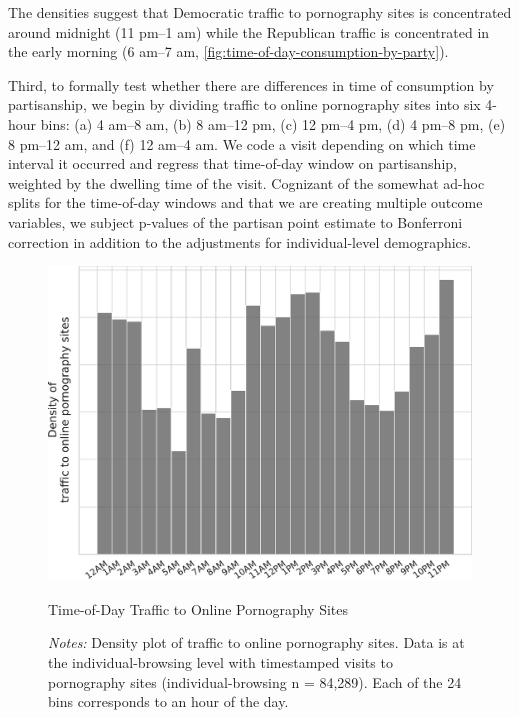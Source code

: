 \documentclass[12pt,twoside]{article}
\begin{document}
The densities suggest that Democratic traffic to pornography sites is concentrated around midnight (11 pm--1 am) while the Republican traffic is concentrated in the early morning (6 am--7 am, \cref{fig:time-of-day-consumption-by-party}).

Third, to formally test whether there are differences in time of consumption by partisanship, we begin by dividing traffic to online pornography sites into six 4-hour bins: (a) 4 am--8 am, (b) 8 am--12 pm, (c) 12 pm--4 pm, (d) 4 pm--8 pm, (e) 8 pm--12 am, and (f) 12 am--4 am. We code a visit depending on which time interval it occurred and regress that time-of-day window on partisanship, weighted by the dwelling time of the visit. Cognizant of the somewhat ad-hoc splits for the time-of-day windows and that we are creating multiple outcome variables, we subject p-values of the partisan point estimate to Bonferroni correction in addition to the adjustments for individual-level demographics.

\begin{figure}[ht]
\centering
    \includegraphics[width=.75\linewidth]{figs/time-of-day-consumption.pdf}
\caption{Time-of-Day Traffic to Online Pornography Sites}
\caption*{\footnotesize \emph{Notes:} 
        Density plot of traffic to online pornography sites.
        Data is at the individual-browsing level with timestamped visits to pornography sites (individual-browsing n = 84,289).
        Each of the 24 bins corresponds to an hour of the day.
	}
    \label{fig:time-of-day-consumption}
\end{figure}
\end{document}
